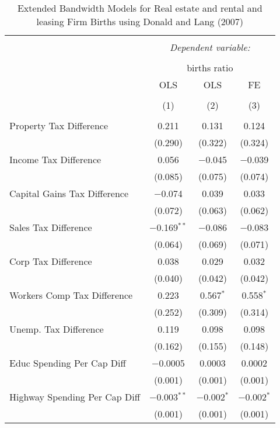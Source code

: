 
\begin{table}[!htbp] \centering 
  \caption{Extended Bandwidth Models for  Real estate and rental and leasing Firm Births using Donald and Lang (2007)} 
  \label{} 
\begin{tabular}{@{\extracolsep{5pt}}lccc} 
\\[-1.8ex]\hline 
\hline \\[-1.8ex] 
 & \multicolumn{3}{c}{\textit{Dependent variable:}} \\ 
\cline{2-4} 
\\[-1.8ex] & \multicolumn{3}{c}{births ratio} \\ 
 & OLS & OLS & FE \\ 
\\[-1.8ex] & (1) & (2) & (3)\\ 
\hline \\[-1.8ex] 
 Property Tax Difference & 0.211 & 0.131 & 0.124 \\ 
  & (0.290) & (0.322) & (0.324) \\ 
  Income Tax Difference & 0.056 & $-$0.045 & $-$0.039 \\ 
  & (0.085) & (0.075) & (0.074) \\ 
  Capital Gains Tax Difference & $-$0.074 & 0.039 & 0.033 \\ 
  & (0.072) & (0.063) & (0.062) \\ 
  Sales Tax Difference & $-$0.169$^{**}$ & $-$0.086 & $-$0.083 \\ 
  & (0.064) & (0.069) & (0.071) \\ 
  Corp Tax Difference & 0.038 & 0.029 & 0.032 \\ 
  & (0.040) & (0.042) & (0.042) \\ 
  Workers Comp Tax Difference & 0.223 & 0.567$^{*}$ & 0.558$^{*}$ \\ 
  & (0.252) & (0.309) & (0.314) \\ 
  Unemp. Tax Difference & 0.119 & 0.098 & 0.098 \\ 
  & (0.162) & (0.155) & (0.148) \\ 
  Educ Spending Per Cap Diff & $-$0.0005 & 0.0003 & 0.0002 \\ 
  & (0.001) & (0.001) & (0.001) \\ 
  Highway Spending Per Cap Diff & $-$0.003$^{**}$ & $-$0.002$^{*}$ & $-$0.002$^{*}$ \\ 
  & (0.001) & (0.001) & (0.001) \\ 

\end{tabular}
\end{table}
